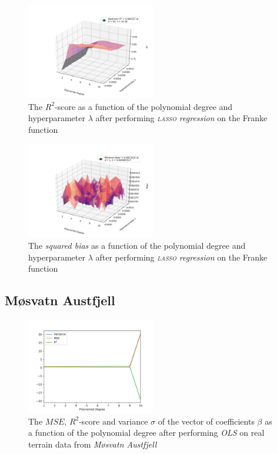 \documentclass[a4paper,10pt,english]{article}
\begin{document}
\begin{figure}[H]
	\centering 
	\includegraphics[width = 0.5\textwidth, center]{../franke_output/part_E_3.png}
	\caption{The $R^2$-score as a function of the polynomial degree and hyperparameter $\lambda$ after performing \textit{\textsc{lasso} regression} on the Franke function}
	\label{fig_14}
\end{figure}

\begin{figure}[H]
	\centering 
	\includegraphics[width = 0.5\textwidth, center]{../franke_output/part_E_4.png}
	\caption{The \textit{squared bias} as a function of the polynomial degree and hyperparameter $\lambda$ after performing \textit{\textsc{lasso} regression} on the Franke function}
	\label{fig_15}
\end{figure}

\subsection*{Møsvatn Austfjell}

\begin{figure}[H]
	\centering 
	\includegraphics[width = 0.5\textwidth, center]{../real_output/part_A.png}
	\caption{The $MSE$, $R^2$-score and variance $\sigma$ of the vector of coefficients $\beta$ as a function of the polynomial degree after performing \textit{OLS} on real terrain data from \textit{Møsvatn Austfjell}}
	\label{fig_16}
\end{figure}
\end{document}
